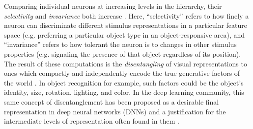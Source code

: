 \documentclass[10pt,letterpaper]{article}
\begin{document}
Comparing individual neurons at increasing levels in the hierarchy, their \textit{selectivity} and \textit{invariance} both increase \cite{Rust2010}. Here, ``selectivity'' refers to how %
finely a neuron can discriminate different stimulus representations in a particular feature space (e.g. preferring a particular object type in an object-responsive area), and ``invariance'' refers to how tolerant the neuron is to changes in other stimulus properties (e.g. signaling the presence of that object regardless of its position). The result of these computations is the \textit{disentangling} of visual representations to ones which compactly and independently encode the true generative factors of the world \cite{DiCarlo2007}. In object recognition for example, such factors could be the object's identity, size, rotation, lighting, and color. In the deep learning community, this same concept of disentanglement has been proposed as a desirable final representation in deep neural networks (DNNs) and a justification for the intermediate levels of representation often found in them \cite{Bengio2009}.

\end{document}
